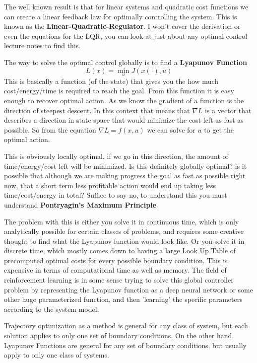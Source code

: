 \documentclass[a4paper, 10pt, twocolumn]{article}
\begin{document}
The well known result is that for linear systems and quadratic cost functions we can create a linear feedback law for optimally controlling the system. This is known as the \textbf{Linear-Quadratic-Regulator}. I won't cover the derivation or even the equations for the LQR, you can look at just about any optimal control lecture notes to find this.

The way to solve the optimal control globally is to find a \textbf{Lyapunov Function}
\begin{equation*}
    L(x) = \min_{u} J(x(\cdot), u)
\end{equation*}
This is basically a function (of the state) that gives you the how much cost/energy/time is required to reach the goal.
From this function it is easy enough to recover optimal action.
As we know the gradient of a function is the direction of steepest descent.
In this context that means that \(\nabla L\) is a vector that describes a direction in state space that would minimize the cost left as fast as possible. So from the equation \( \nabla L = f(x, u) \) we can solve for \(u\) to get the optimal action.

This is obviously locally optimal, if we go in this direction, the amount of time/energy/cost left will be minimized. Is this definitely globally optimal? is it possible that although we are making progress the goal as fast as possible right now, that a short term less profitable action would end up taking less time/cost/energy in total? Suffice to say no, to understand this you must understand \textbf{Pontryagin's Maximum Principle}

The problem with this is either you solve it in continuous time, which is only analytically possible for certain classes of problems, and requires some creative thought to find what the Lyapunov function would look like. Or you solve it in discrete time, which mostly comes down to having a large Look Up Table of precomputed optimal costs for every possible boundary condition. This is expensive in terms of computational time as well as memory. The field of reinforcement learning is in some sense trying to solve this global controller problem by representing the Lyapunov function as a deep neural network or some other huge parameterized function, and then 'learning' the specific parameters according to the system model,

Trajectory optimization as a method is general for any class of system, but each solution applies to only one set of boundary conditions. On the other hand, Lyapunov Functions are general for any set of boundary conditions, but usually apply to only one class of systems.
\end{document}
